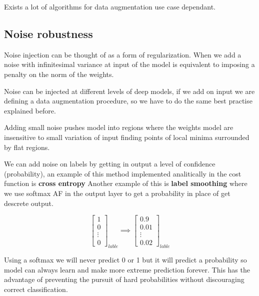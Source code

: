 Exists a lot of algorithms for data augmentation use case dependant.

\subsection{Noise robustness}
Noise injection can be thought of as a form of regularization. When we add a noise 
with infinitesimal variance at input of the model is equivalent to imposing a penalty
on the norm of the weights. 

Noise can be injected at different levels of deep models, if we add on input we are 
defining a data augmentation procedure, so we have to do the same best practise 
explained before.

Adding small noise pushes model into regions where the weights model are insensitive to small 
variation of input finding points of local minima surrounded by flat regions.

We can add noise on labels by getting in output a level of confidence (probability),
an example of this method implemented analitically in the cost function is \textbf{cross entropy} 
Another example of this is \textbf{label smoothing} where we use softmax AF in
the output layer to get a probability in place of get descrete output.

$$\left[\begin{array}{c}
    1\\0\\\vdots\\ 0
\end{array}\right]_{lable} \implies \left[\begin{array}{c}
    0.9\\0.01\\\vdots\\ 0.02
\end{array}\right]_{lable}$$

Using a softmax we will never predict 0 or 1 but it will predict a probability so 
model can always learn and make more extreme prediction forever. This has the advantage 
of preventing the pursuit of hard probabilities without discouraging correct classification.

